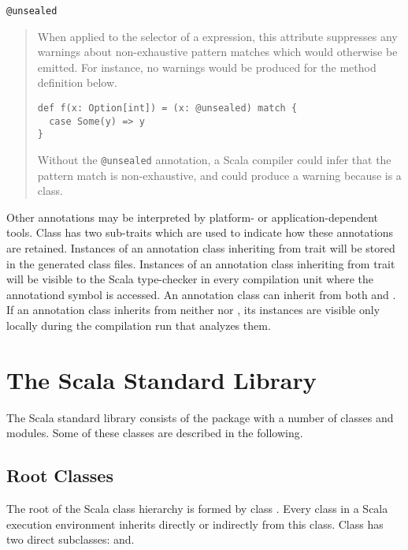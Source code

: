 {\lstinline^@unsealed^
\begin{quote}
When applied to the selector of a \lstinline@match@ expression,
this attribute suppresses any warnings about non-exhaustive pattern
matches which would otherwise be emitted. For instance, no warnings
would be produced for the method definition below.
\begin{lstlisting}
def f(x: Option[int]) = (x: @unsealed) match {
  case Some(y) => y
}
\end{lstlisting}
Without the \lstinline^@unsealed^ annotation, a Scala compiler could
infer that the pattern match is non-exhaustive, and could produce a
warning because \lstinline@Option@ is a \lstinline@sealed@ class.
\end{quote}

Other annotations may be interpreted by platform- or
application-dependent tools. Class  has two
sub-traits which are used to indicate how these annotations are
retained. Instances of an annotation class inheriting from trait
 will be stored in the generated class
files. Instances of an annotation class inheriting from trait
 will be visible to the Scala type-checker
in every compilation unit where the annotationd symbol is accessed. An
annotation class can inherit from both 
and . If an annotation class inherits from
neither  nor
, its instances are visible only locally
during the compilation run that analyzes them.

\chapter{The Scala Standard Library}

The Scala standard library consists of the package  with a
number of classes and modules. Some of these classes are described in
the following.

\section{Root Classes}
\label{sec:cls-root}
\label{sec:cls-any}
\label{sec:cls-object}

The root of the Scala class hierarchy is formed by class .
Every class in a Scala execution environment inherits directly or
indirectly from this class.  Class  has two direct
subclasses:  and.

}
